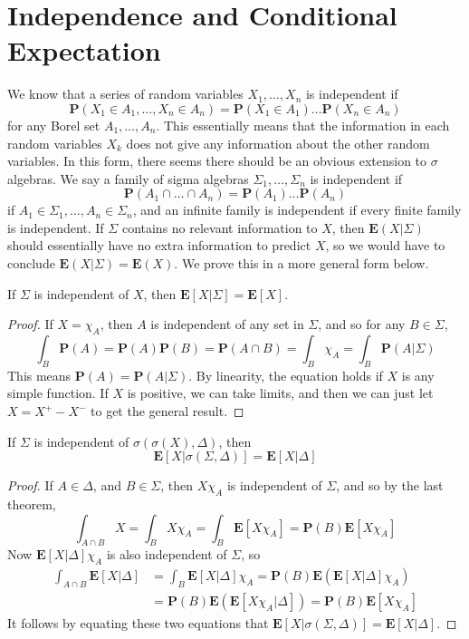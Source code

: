 \section{Independence and Conditional Expectation}

We know that a series of random variables $X_1, \dots, X_n$ is independent if
%
\[ \mathbf{P}(X_1 \in A_1, \dots, X_n \in A_n) = \mathbf{P}(X_1 \in A_1) \dots \mathbf{P}(X_n \in A_n) \]
%
for any Borel set $A_1, \dots, A_n$. This essentially means that the information in each random variables $X_k$ does not give any information about the other random variables. In this form, there seems there should be an obvious extension to $\sigma$ algebras. We say a family of sigma algebras $\Sigma_1, \dots, \Sigma_n$ is independent if
%
\[ \mathbf{P}(A_1 \cap \dots \cap A_n) = \mathbf{P}(A_1) \dots \mathbf{P}(A_n) \]
%
if $A_1 \in \Sigma_1, \dots, A_n \in \Sigma_n$, and an infinite family is independent if every finite family is independent. If $\Sigma$ contains no relevant information to $X$, then $\mathbf{E}(X|\Sigma)$ should essentially have no extra information to predict $X$, so we would have to conclude $\mathbf{E}(X|\Sigma) = \mathbf{E}(X)$. We prove this in a more general form below.

\begin{theorem}
    If $\Sigma$ is independent of $X$, then $\mathbf{E}[X|\Sigma] = \mathbf{E}[X]$.
\end{theorem}
\begin{proof}
    If $X = \chi_A$, then $A$ is independent of any set in $\Sigma$, and so for any $B \in \Sigma$,
    \[ \int_B \mathbf{P}(A) = \mathbf{P}(A) \mathbf{P}(B) = \mathbf{P}(A \cap B) = \int_B \chi_A = \int_B \mathbf{P}(A|\Sigma) \]
    This means $\mathbf{P}(A) = \mathbf{P}(A|\Sigma)$. By linearity, the equation holds if $X$ is any simple function. If $X$ is positive, we can take limits, and then we can just let $X = X^+ - X^-$ to get the general result.
\end{proof}

\begin{corollary}
    If $\Sigma$ is independent of $\sigma(\sigma(X), \Delta)$, then
    \[ \mathbf{E}[X|\sigma(\Sigma,\Delta)] = \mathbf{E}[X|\Delta] \]
\end{corollary}
\begin{proof}
    If $A \in \Delta$, and $B \in \Sigma$, then $X\chi_A$ is independent of $\Sigma$, and so by the last theorem,
    \[ \int_{A \cap B} X = \int_B X\chi_A = \int_B \mathbf{E}[X\chi_A] = \mathbf{P}(B) \mathbf{E}[X\chi_A] \]
    Now $\mathbf{E}[X|\Delta] \chi_A$ is also independent of $\Sigma$, so
    \begin{align*}
        \int_{A \cap B} \mathbf{E}[X|\Delta] &= \int_B \mathbf{E}[X|\Delta] \chi_A = \mathbf{P}(B) \mathbf{E}(\mathbf{E}[X|\Delta] \chi_A)\\
        &= \mathbf{P}(B) \mathbf{E}(\mathbf{E}[X\chi_A|\Delta]) = \mathbf{P}(B) \mathbf{E}[X\chi_A]
    \end{align*}
    It follows by equating these two equations that $\mathbf{E}[X|\sigma(\Sigma,\Delta)] = \mathbf{E}[X|\Delta]$.
\end{proof}

